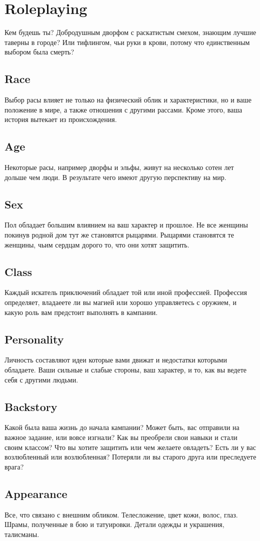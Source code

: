 \documentclass[a5paper,11pt]{book}
\begin{document}
\chapter{Roleplaying}
\begin{multicols}{2}
\lettrine{К}{}ем будешь ты? Добродушным дворфом с раскатистым смехом, знающим лучшие таверны в городе? Или тифлингом, чьи руки в крови, потому что единственным выбором была смерть?

\section{Race}
Выбор расы влияет не только на физический облик и характеристики, но и ваше положение в мире, а также отношения с другими рассами. Кроме этого, ваша история вытекает из происхождения.

\section{Age}
Некоторые расы, например дворфы и эльфы, живут на несколько сотен лет дольше чем люди. В результате чего имеют другую перспективу на мир.

\section{Sex}
Пол обладает большим влиянием на ваш характер и прошлое. Не все женщины покинув родной дом тут же становятся рыцарями. Рыцарями становятся те женщины, чьим сердцам дорого то, что они хотят защитить.

\section{Class}
Каждый искатель приключений обладает той или иной профессией. Профессия определяет, владаеете ли вы магией или хорошо управляетесь с оружием, и какую роль вам предстоит выполнять в кампании.

\section{Personality}
Личность составляют идеи которые вами движат и недостатки которыми обладаете. Ваши сильные и слабые стороны, ваш характер, и то, как вы ведете себя с другими людьми.

\section{Backstory}
Какой была ваша жизнь до начала кампании? Может быть, вас отправили на важное задание, или вовсе изгнали? Как вы преобрели свои навыки и стали своим классом? Что вы хотите защитить или чем желаете овладеть? Есть ли у вас возлюбленный или возлюбленная? Потеряли ли вы старого друга или преследуете врага?

\section{Appearance}
Все, что связано с внешним обликом. Телесложение, цвет кожи, волос, глаз. Шрамы, полученные в бою и татуировки. Детали одежды и украшения, талисманы.

\end{multicols}
\end{document}
